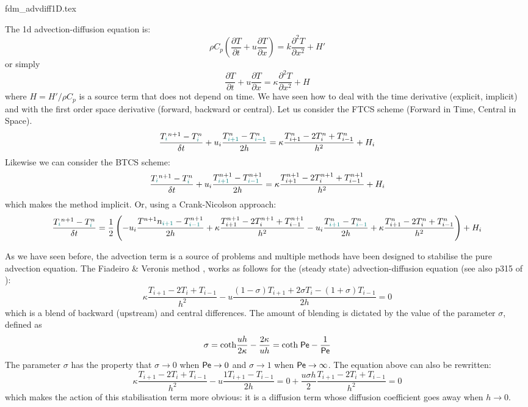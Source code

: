 \begin{flushright} {\tiny {\color{gray} fdm\_advdiff1D.tex}} \end{flushright}

The 1d advection-diffusion equation is:
\begin{equation}
\rho C_p \left( \frac{\partial T}{\partial t}  
+ u \frac{\partial T}{\partial x} \right)= k \frac{\partial^2 T}{\partial x^2} + H'
\end{equation}
or simply
\begin{equation}
\frac{\partial T}{\partial t} + u \frac{\partial T}{\partial x}= \kappa \frac{\partial^2 T}{\partial x^2} + H
\end{equation}
where $H=H'/\rho C_p$ is a source term that does not depend on time.
We have seen how to deal with the time derivative (explicit, implicit) 
and with the first order space derivative (forward, backward or central).
Let us consider the FTCS scheme (Forward in Time, Central in Space).
\[
\frac{T_{\color{teal}i}^{n+1}-T^n_{\color{teal}i}}{\delta t} 
+ u_i \frac{T^n_{\color{teal}i+1} - T^n_{{\color{teal}i-1}}}{2h} = \kappa \frac{T_{i+1}^n-2T_i^n+T_{i-1}^n}{h^2} + H_i
\]
Likewise we can consider the BTCS scheme:
\[
\frac{T_{\color{teal}i}^{n+1}-T^n_{\color{teal}i}}{\delta t} 
+ u_i \frac{T^{n+1}_{\color{teal}i+1} - T^{n+1}_{{\color{teal}i-1}}}{2h} 
= \kappa \frac{T_{i+1}^{n+1}-2T_i^{n+1}+T_{i-1}^{n+1}}{h^2} + H_i
\]
which makes the method implicit. 
Or, using a Crank-Nicolson approach:
\[
\frac{T_{\color{teal}i}^{n+1}-T^n_{\color{teal}i}}{\delta t} 
=
\frac12
\left(
- u_i \frac{T^{n+1}n_{\color{teal}i+1} - T^{n+1}_{{\color{teal}i-1}}}{2h} 
+ \kappa \frac{T_{i+1}^{n+1}-2T_i^{n+1}+T_{i-1}^{n+1}}{h^2} 
- u_i \frac{T^n_{\color{teal}i+1} - T^n_{{\color{teal}i-1}}}{2h} + \kappa \frac{T_{i+1}^n-2T_i^n+T_{i-1}^n}{h^2} 
\right)
+ H_i
\]




As we have seen before, the advection term is a source of problems and multiple 
methods have been designed to stabilise the pure advection equation. 
The {\color{olive}Fiadeiro \& Veronis method} \cite{five77,wrig92}, works as follows for the (steady state)
advection-diffusion equation (see also p315 of \textcite{boudreau}):
\[
\kappa \frac{T_{i+1}-2T_i + T_{i-1}}{h^2}
- u \frac{(1-\sigma) T_{i+1}+2\sigma T_i -(1+\sigma)T_{i-1}}{2 h} = 0
\]
which is a blend of backward (upstream) and central differences. The amount of
blending is dictated by the value of the parameter $\sigma$, defined as
\[
\sigma 
= \text{coth} \frac{u h}{2 \kappa} - \frac{2 \kappa}{u h}
= \text{coth} \; {\mathsf{Pe}}  - \frac{1}{{\mathsf{Pe}}}
\]
The parameter $\sigma$ has the property that
$\sigma \rightarrow 0$ when ${\mathsf{Pe}} \rightarrow 0$ and 
$\sigma \rightarrow 1$ when ${\mathsf{Pe}} \rightarrow \infty$.
The equation above can also be rewritten:
\[
\kappa \frac{T_{i+1}-2T_i + T_{i-1}}{h^2}
- u \frac{1 T_{i+1}-T_{i-1}}{2 h} = 0
+ \frac{u \sigma h}{2} \frac{T_{i+1}-2 T_i +T_{i-1}}{h^2} = 0
\]
which makes the action of this stabilisation term more obvious: it is a diffusion term whose 
diffusion coefficient goes away when $h\rightarrow 0$. 

